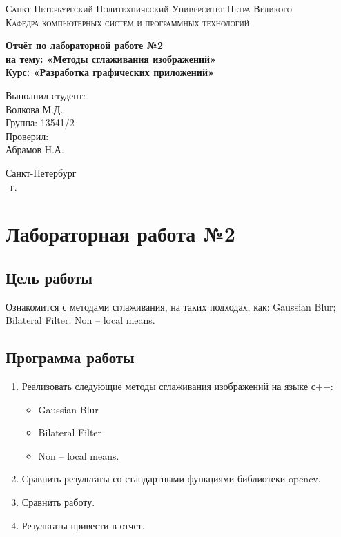 \documentclass[14pt,a4paper,report]{report}
\begin{document}
\def\contentsname{Содержание}

\begin{titlepage}
	\begin{center}
		\textsc{Санкт-Петербургский Политехнический 
			Университет Петра Великого\\[5mm]
			Кафедра компьютерных систем и программных технологий}
		
		\vfill
		
		\textbf{Отчёт по лабораторной работе №2\\[3mm]
		на тему: «Методы сглаживания изображений»\\[3mm]
			Курс: «Разработка графических приложений»\\[41mm]
		}
	\end{center}
	
	\hfill
	\begin{minipage}{.4\textwidth}
		Выполнил студент:\\[2mm] 
		Волкова М.Д.\\
		Группа: 13541/2\\[5mm]
		
		Проверил:\\[2mm] 
		Абрамов Н.А.
	\end{minipage}
	\vfill
	\begin{center}
		Санкт-Петербург\\ \the\year\ г.
	\end{center}
\end{titlepage}

\tableofcontents
\clearpage

\chapter{Лабораторная работа №2}

\section{Цель работы}

Ознакомится с методами сглаживания, на таких подходах, как: Gaussian Blur; Bilateral Filter; Non – local means.

\section{Программа работы}

\begin{enumerate}
\item Реализовать следующие методы сглаживания изображений на языке с++:
\begin{itemize}
\item Gaussian Blur
\item Bilateral Filter
\item Non – local means.
\end{itemize}
\item Сравнить результаты со стандартными функциями библиотеки opencv.
\item Сравнить работу.
\item Результаты привести в отчет.
\end{enumerate}
\end{document}
